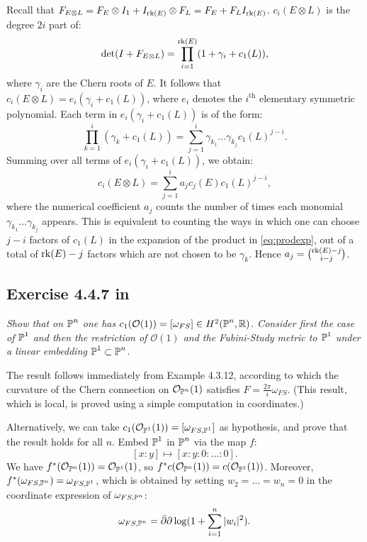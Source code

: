 \documentclass{article}
\begin{document}
Recall that $F_{E\otimes L} = F_E \otimes I_1 + I_{\operatorname{rk}(E)} \otimes F_L = F_E + F_L I_{\operatorname{rk}(E)}$. $c_i(E \otimes L)$
is the degree $2i$ part of:
\[	\det(I + F_{E\otimes L}) = \prod_{i=1}^{\operatorname{rk}(E)} (1 + \gamma_i + c_1(L)),	\]
where $\gamma_i$ are the Chern roots of $E$. It follows that $c_i(E\otimes L) = e_i(\gamma_i + c_1(L))$, where $e_i$
denotes the $i^{\text{th}}$ elementary symmetric polynomial. Each term in $e_i(\gamma_i + c_1(L))$ is of the form:
\begin{equation}
\label{eq:prodexp}
	\prod_{k=1}^i (\gamma_k + c_1(L)) = \sum_{j=1}^i \gamma_{k_1} \dots \gamma_{k_j} c_1(L)^{j-i} .
\end{equation}
Summing over all terms of $e_i(\gamma_i + c_1(L))$, we obtain:
\[	c_i(E\otimes L) = \sum_{j=1}^i a_j c_j(E) c_1(L)^{j-i},	\]
where the numerical coefficient $a_j$ counts the number of times each monomial $\gamma_{k_1} \dots \gamma_{k_j}$
appears. This is equivalent to counting the ways in which one can choose $j-i$ factors of $c_1(L)$ in the expansion of
the product in \ref{eq:prodexp}, out of a total of $\operatorname{rk}(E) - j$ factors which are not chosen to be $\gamma_k$.
Hence $a_j = \binom{\operatorname{rk}(E) - j}{i-j}$.





\subsection*{Exercise 4.4.7 in \cite{Huy}}
\emph{Show that on $\operatorname{\mathbb{P}}^n$ one has $c_1(\mathcal{O}(1)) = [\omega_{FS}] \in H^2(\operatorname{\mathbb{P}}^n,\mathbb{R})$. Consider first the
case of $\operatorname{\mathbb{P}}^1$ and then the restriction of $\mathcal{O}(1)$ and the Fubini-Study metric to $\operatorname{\mathbb{P}}^1$ under
a linear embedding $\operatorname{\mathbb{P}}^1 \subset \operatorname{\mathbb{P}}^n$.}
\vspace{3mm}

The result follows immediately from Example 4.3.12, according to which the curvature of the Chern connection on
$\mathcal{O}_{\operatorname{\mathbb{P}}^n}(1)$ satisfies $F = \frac{2\pi}{i} \omega_{FS}$. (This result, which is local, is proved using
a simple computation in coordinates.)

Alternatively, we can take $c_1(\mathcal{O}_{\operatorname{\mathbb{P}}^1}(1)) = [\omega_{FS,\operatorname{\mathbb{P}}^1}]$ as hypothesis, and prove that the
result holds for all $n$. Embed $\operatorname{\mathbb{P}}^1$ in $\operatorname{\mathbb{P}}^n$ 
via the map $f$:
\[	[x:y] \mapsto [x:y:0:\dots:0].	\]
We have $f^*(\mathcal{O}_{\operatorname{\mathbb{P}}^n}(1)) = \mathcal{O}_{\operatorname{\mathbb{P}}^1}(1)$, so $f^* c(\mathcal{O}_{\operatorname{\mathbb{P}}^n}(1)) = c
(\mathcal{O}_{\operatorname{\mathbb{P}}^1}(1))$. Moreover, $f^*(\omega_{FS,\operatorname{\mathbb{P}}^n}) = \omega_{FS,\operatorname{\mathbb{P}}^1}$, which
is obtained by setting $w_2 = \dots = w_n = 0$ in the coordinate expression of $\omega_{FS,\operatorname{\mathbb{P}}^n}$:
\[	\omega_{FS,\operatorname{\mathbb{P}}^n} = \bar {\partial} \partial \log(1 + \sum_{i=1}^n |w_i|^2).	\]
\end{document}
